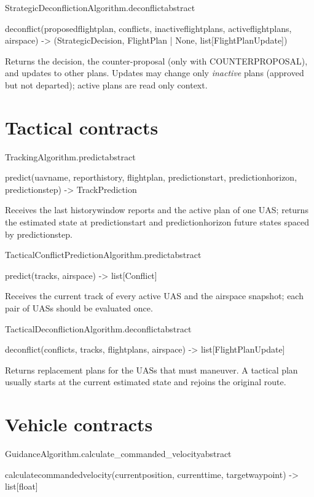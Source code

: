 \documentclass[11pt,a4paper,oneside]{report}
\newcommand{\sig}[1]{\par{\small\ttfamily\def\_{\textunderscore\allowbreak}\color{primary!85!black}#1}\par}
\newcommand{\code}[1]{\textcolor{primary!85!black}{\ttfamily\def\_{\textunderscore\allowbreak}#1}}
\begin{document}
\begin{api}{StrategicDeconflictionAlgorithm.deconflict}{abstract}
\sig{deconflict(proposed\_flight\_plan, conflicts, inactive\_flight\_plans,
active\_flight\_plans, airspace) -> (StrategicDecision, FlightPlan | None,
list[FlightPlanUpdate])}
Returns the decision, the counter-proposal (only with
\code{COUNTER\_PROPOSAL}), and updates to other plans. Updates may change
only \emph{inactive} plans (approved but not departed); active plans are read
only context.
\end{api}

\section{Tactical contracts}

\begin{api}{TrackingAlgorithm.predict}{abstract}
\sig{predict(uav\_name, report\_history, flight\_plan, prediction\_start,
prediction\_horizon, prediction\_step) -> TrackPrediction}
Receives the last \code{history\_window} reports and the active plan of one
UAS; returns the estimated state at \code{prediction\_start} and
\code{prediction\_horizon} future states spaced by \code{prediction\_step}.
\end{api}

\begin{api}{TacticalConflictPredictionAlgorithm.predict}{abstract}
\sig{predict(tracks, airspace) -> list[Conflict]}
Receives the current track of every active UAS and the airspace snapshot;
each pair of UASs should be evaluated once.
\end{api}

\begin{api}{TacticalDeconflictionAlgorithm.deconflict}{abstract}
\sig{deconflict(conflicts, tracks, flight\_plans, airspace) ->
list[FlightPlanUpdate]}
Returns replacement plans for the UASs that must maneuver. A tactical plan
usually starts at the current estimated state and rejoins the original
route.
\end{api}

\section{Vehicle contracts}

\begin{api}{GuidanceAlgorithm.calculate\_commanded\_velocity}{abstract}
\sig{calculate\_commanded\_velocity(current\_position, current\_time,
target\_waypoint) -> list[float]}
\end{api}
\end{document}
